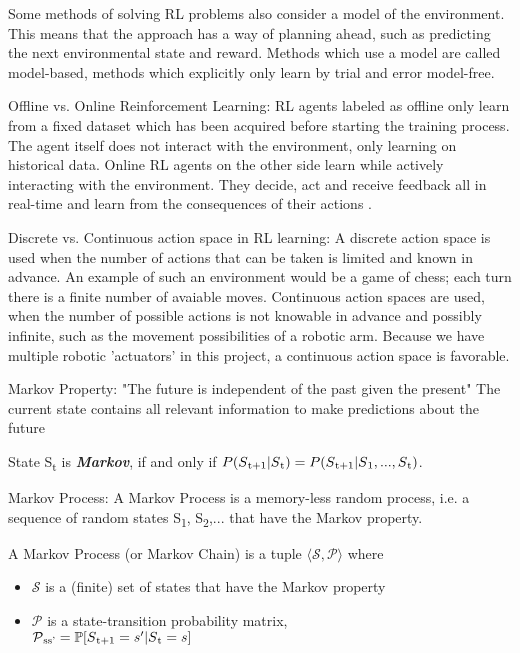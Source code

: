 Some methods of solving RL problems also consider a model of the environment. This means that the approach has a way of planning ahead, such as predicting the next environmental state and reward.
Methods which use a model are called model-based, methods which explicitly only learn by trial and error model-free\parencite{sutton2018reinforcement}.

Offline vs. Online Reinforcement Learning: 
RL agents labeled as offline only learn from a fixed dataset which has been acquired before starting the training process.
The agent itself does not interact with the environment, only learning on historical data.
Online RL agents on the other side learn while actively interacting with the environment.
They decide, act and receive feedback all in real-time and learn from the consequences of their actions \parencite{schrittwieser2021online}.



Discrete vs. Continuous action space in RL learning: 
A discrete action space is used when the number of actions that can be taken is limited and known in advance. An example of such an environment would be a game of chess; each turn there is a finite number of avaiable moves.
Continuous action spaces are used, when the number of possible actions is not knowable in advance and possibly infinite, such as the movement possibilities of a robotic arm.
Because we have multiple robotic 'actuators' in this project, a continuous action space is favorable.


Markov Property: "The future is independent of the past given the present"
The current state contains all relevant information to make predictions about the future
\begin{definition*}
	State S\textsubscript{t} is \textbf{\textit{Markov}}, if and only if
	$ P(S\textsubscript{t+1} | S\textsubscript{t}) = P(S\textsubscript{t+1} | S\textsubscript{1},...,S\textsubscript{t}) $.
\end{definition*}

Markov Process:
A Markov Process is a memory-less random process, i.e. a sequence of random states S\textsubscript{1}, S\textsubscript{2},... that have the Markov property.

\begin{definition*}
	A Markov Process (or Markov Chain) is a tuple $\langle\mathcal{S,P}\rangle$ where
		\begin{itemize}
		\item $\mathcal{S}$ is a (finite) set of states that have the Markov property
		\item $\mathcal{P}$ is a state-transition probability matrix,\\
		$\mathcal{P}\textsubscript{ss'} = \mathbb{P}[S\textsubscript{t+1} = s'|S\textsubscript{t}=s] $
	\end{itemize}
\end{definition*}

